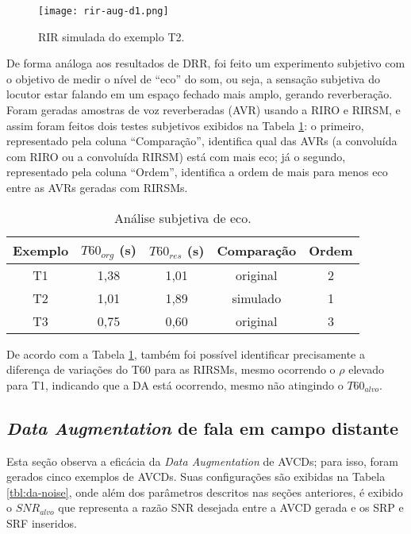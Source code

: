 \begin{figure} [H]
    \centering
    \texttt{[image: rir-aug-d1.png]}
    \caption{RIR simulada do exemplo T2.}
    \label{fig:rir-aug-t2}
\end{figure} 

De forma análoga aos resultados de DRR, foi feito um experimento subjetivo com o objetivo de medir o nível de “eco” do som, ou seja,
a sensação subjetiva do locutor estar falando em um espaço fechado mais amplo, gerando reverberação.
Foram geradas amostras de voz reverberadas (AVR) usando a RIRO e RIRSM, e assim foram feitos dois testes subjetivos exibidos na Tabela \ref{tbl:t60-exp}:
o primeiro, representado pela coluna “Comparação”, identifica qual das AVRs (a convoluída com RIRO ou a convoluída RIRSM) está com mais eco;
já o segundo, representado pela coluna “Ordem”, identifica a ordem de mais para menos eco entre as AVRs geradas com RIRSMs.

\begin{table} [H]
    \centering
    \caption{Análise subjetiva de eco.}
    \label{tbl:t60-exp}
    \begin{tabular}{c|c|c|c|c}

        \textbf{Exemplo} & 
        \textbf{$T60_{org}$ (s)} & 
        \textbf{$T60_{res}$ (s)} & 
        \textbf{Comparação} &
        \textbf{Ordem} \\
        \hline 

        T1 & 1,38 & 1,01 & original & 2 \\
        T2 & 1,01 & 1,89 & simulado & 1 \\
        T3 & 0,75 & 0,60 & original & 3 \\

    \end{tabular}
\end{table}

De acordo com a Tabela \ref{tbl:t60-exp}, também foi possível identificar precisamente a diferença de variações do T60 para as RIRSMs,
mesmo ocorrendo o $\rho$ elevado para T1, indicando que a DA está ocorrendo, mesmo não atingindo o $T60_{alvo}$.


\subsection{\textit{Data Augmentation} de fala em campo distante}

Esta seção observa a eficácia da \textit{Data Augmentation} de AVCDs; para isso, foram gerados cinco exemplos de AVCDs. Suas configurações
são exibidas na Tabela \ref{tbl:da-noise}, onde além dos parâmetros descritos nas seções anteriores, é exibido o $SNR_{alvo}$ que representa
a razão SNR desejada entre a AVCD gerada e os SRP e SRF inseridos.

